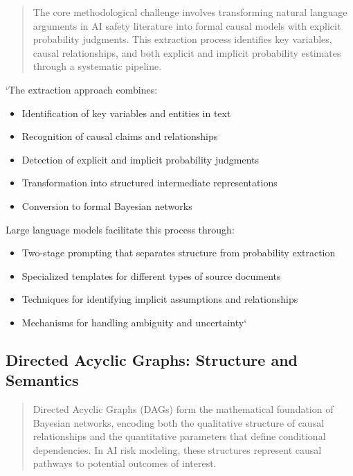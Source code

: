 \documentclass[12pt,a4paper]{report}
\providecommand{\tightlist}{%
  \setlength{\itemsep}{0pt}\setlength{\parskip}{0pt}}
\begin{document}
\begin{quote}
The core methodological challenge involves transforming natural language
arguments in AI safety literature into formal causal models with
explicit probability judgments. This extraction process identifies key
variables, causal relationships, and both explicit and implicit
probability estimates through a systematic pipeline.
\end{quote}

`The extraction approach combines:

\begin{itemize}
\tightlist
\item
  Identification of key variables and entities in text
\item
  Recognition of causal claims and relationships
\item
  Detection of explicit and implicit probability judgments
\item
  Transformation into structured intermediate representations
\item
  Conversion to formal Bayesian networks
\end{itemize}

Large language models facilitate this process through:

\begin{itemize}
\tightlist
\item
  Two-stage prompting that separates structure from probability
  extraction
\item
  Specialized templates for different types of source documents
\item
  Techniques for identifying implicit assumptions and relationships
\item
  Mechanisms for handling ambiguity and uncertainty`
\end{itemize}

\subsection{Directed Acyclic Graphs: Structure and
Semantics}\label{sec-directed-acyclic-graphs}

\begin{quote}
Directed Acyclic Graphs (DAGs) form the mathematical foundation of
Bayesian networks, encoding both the qualitative structure of causal
relationships and the quantitative parameters that define conditional
dependencies. In AI risk modeling, these structures represent causal
pathways to potential outcomes of interest.
\end{quote}
\end{document}
